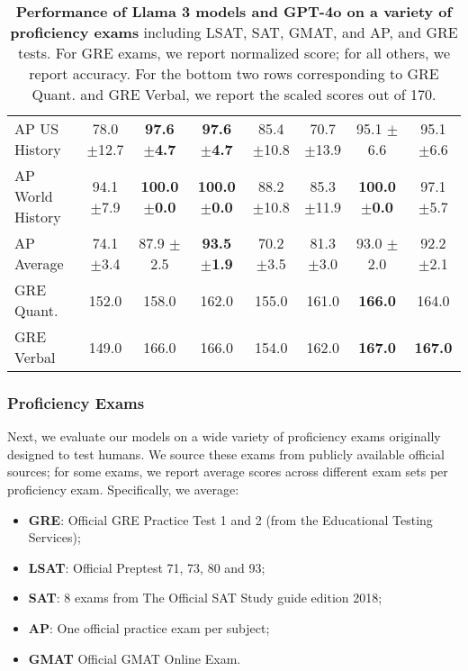 \begin{table*}[t]
\begin{NiceTabular}{lccccccc}
AP US History & 78.0 \scriptsize{$\pm$12.7} & \textbf{97.6 \scriptsize{$\pm$4.7}} & \textbf{97.6 \scriptsize{$\pm$4.7}} & 85.4 \scriptsize{$\pm$10.8} & 70.7 \scriptsize{$\pm$13.9} & 95.1 \scriptsize{$\pm$6.6} & 95.1 \scriptsize{$\pm$6.6} \\
AP World History & 94.1 \scriptsize{$\pm$7.9} & \textbf{100.0 \scriptsize{$\pm$0.0}} & \textbf{100.0 \scriptsize{$\pm$0.0}} & 88.2 \scriptsize{$\pm$10.8} & 85.3 \scriptsize{$\pm$11.9} & \textbf{100.0 \scriptsize{$\pm$0.0}} & 97.1 \scriptsize{$\pm$5.7} \\
AP Average & 74.1 \scriptsize{$\pm$3.4} & 87.9 \scriptsize{$\pm$2.5} & \textbf{93.5 \scriptsize{$\pm$1.9}} & 70.2 \scriptsize{$\pm$3.5} & 81.3 \scriptsize{$\pm$3.0} & 93.0 \scriptsize{$\pm$2.0} & 92.2 \scriptsize{$\pm$2.1} \\
\midrule
GRE Quant. & 152.0 & 158.0 & 162.0 & 155.0 & 161.0 & \textbf{166.0} & 164.0 \\
GRE Verbal & 149.0 & 166.0 & 166.0 & 154.0 & 162.0 & \textbf{167.0} & \textbf{167.0} \\
    \bottomrule
    \end{NiceTabular}
 \caption{\textbf{Performance of Llama 3 models and GPT-4o on a variety of proficiency exams} including LSAT, SAT, GMAT, and AP, and GRE tests. For GRE exams, we report normalized score; for all others, we report accuracy. For the bottom two rows corresponding to GRE Quant. and GRE Verbal, we report the scaled scores out of 170.}
    \label{table:proficiency_exam_results}
\end{table*}

\subsubsection{Proficiency Exams}
\label{subsec:proficiency}

Next, we evaluate our models on a wide variety of proficiency exams originally designed to test humans.
We source these exams from publicly available official sources; for some exams, we report average scores across different exam sets per proficiency exam.
Specifically, we average:\begin{itemize}
    \item \textbf{GRE}: Official GRE Practice Test 1 and 2 (from the Educational Testing Services);
    \item \textbf{LSAT}: Official Preptest 71, 73, 80 and 93;
    \item \textbf{SAT}: 8 exams from The Official SAT Study guide edition 2018;
    \item \textbf{AP}: One official practice exam per subject;
    \item \textbf{GMAT} Official GMAT Online Exam.
\end{itemize}

